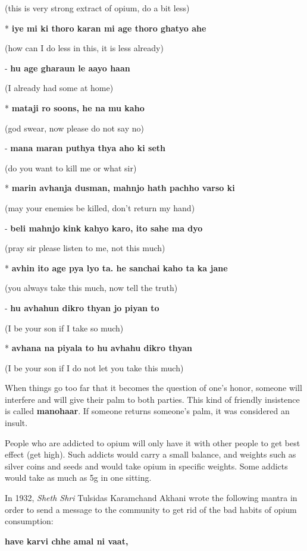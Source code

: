 (this is very strong extract of opium, do a bit less)

* \textbf{iye mi ki thoro karan mi age thoro ghatyo ahe}

(how can I do less in this, it is less already)

- \textbf{hu age gharaun le aayo haan}

(I already had some at home)

* \textbf{mataji ro soons, he na mu kaho}

(god swear, now please do not say no)

- \textbf{mana maran puthya thya aho ki seth}

(do you want to kill me or what sir)

* \textbf{marin avhanja dusman, mahnjo hath pachho varso ki}

(may your enemies be killed, don't return my hand)

- \textbf{beli mahnjo kink kahyo karo, ito sahe ma dyo}

(pray sir please listen to me, not this much)

* \textbf{avhin ito age pya lyo ta. he sanchai kaho ta ka jane}

(you always take this much, now tell the truth)

- \textbf{hu avhahun dikro thyan jo piyan to}

(I be your son if I take so much)

* \textbf{avhana na piyala to hu avhahu dikro thyan}

(I be your son if I do not let you take this much)

When things go too far that it becomes the question of one's honor, someone
will interfere and will give their palm to both parties. This kind of friendly
insistence is called \textbf{manohaar}. If someone returns someone's palm, it
was considered an insult.

People who are addicted to opium will only have it with other people to get
best effect (get high). Such addicts would carry a small balance, and weights
such as silver coins and seeds and would take opium in specific weights. Some
addicts would take as much as 5g in one sitting.

In 1932, \textit{Sheth Shri} Tulsidas Karamchand Akhani wrote the following
mantra in order to send a message to the community to get rid of the bad habits
of opium consumption:

\textbf{have karvi chhe amal ni vaat,}

